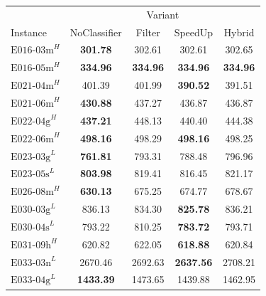 \begin{table}
	\centering
	\small
	\renewcommand{\arraystretch}{1.05}
	\begin{tabular}{lcccc}
		\toprule
		                    & \multicolumn{4}{c}{Variant}                                                        \\\cmidrule(lr){2-5}
		Instance            & NoClassifier                & Filter          & SpeedUp          & Hybrid          \\
		\midrule
		$\text{E016-03m}^H$ & \textbf{301.78  }           & 302.61          & 302.61           & 302.65          \\
		$\text{E016-05m}^H$ & \textbf{334.96 }            & \textbf{334.96} & \textbf{334.96}  & \textbf{334.96} \\
		$\text{E021-04m}^H$ & 401.39                      & 401.99          & \textbf{390.52}  & 391.51          \\
		$\text{E021-06m}^H$ & \textbf{430.88 }            & 437.27          & 436.87           & 436.87          \\
		$\text{E022-04g}^H$ & \textbf{437.21 }            & 448.13          & 440.40           & 444.38          \\
		$\text{E022-06m}^H$ & \textbf{498.16 }            & 498.29          & \textbf{498.16}  & 498.25          \\
		$\text{E023-03g}^L$ & \textbf{761.81 }            & 793.31          & 788.48           & 796.96          \\
		$\text{E023-05s}^L$ & \textbf{803.98 }            & 819.41          & 816.45           & 821.17          \\
		$\text{E026-08m}^H$ & \textbf{630.13 }            & 675.25          & 674.77           & 678.67          \\
		$\text{E030-03g}^L$ & 836.13                      & 834.30          & \textbf{825.78}  & 836.21          \\
		$\text{E030-04s}^L$ & 793.22                      & 810.25          & \textbf{783.72}  & 793.71          \\
		$\text{E031-09h}^H$ & 620.82                      & 622.05          & \textbf{618.88}  & 620.84          \\
		$\text{E033-03n}^L$ & 2670.46                     & 2692.63         & \textbf{2637.56} & 2708.21         \\
		$\text{E033-04g}^L$ & \textbf{1433.39}            & 1473.65         & 1439.88          & 1462.95         \\

\end{tabular}
\end{table}

